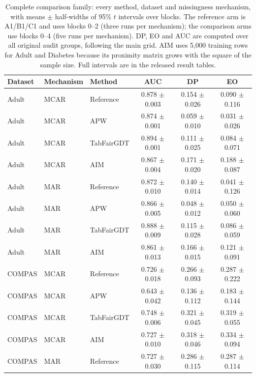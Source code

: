 \begin{table}[tb]
\centering\scriptsize
\setlength{\tabcolsep}{3pt}
\caption{Complete comparison family: every method, dataset and missingness mechanism, with means $\pm$ half-widths of 95\% $t$ intervals over blocks. The reference arm is A1/B1/C1 and uses blocks 0--2 (three runs per mechanism); the comparison arms use blocks 0--4 (five runs per mechanism). DP, EO and AUC are computed over all original audit groups, following the main grid. AIM uses 5{,}000 training rows for Adult and Diabetes because its proximity matrix grows with the square of the sample size. Full intervals are in the released result tables.}\label{tab:comparison-full}
\begin{tabular}{@{}lllccc@{}}
\toprule
Dataset & Mechanism & Method & AUC & DP & EO\\
\midrule
Adult     & MCAR & Reference            & 0.878 $\pm$ 0.003 & 0.154 $\pm$ 0.026 & 0.090 $\pm$ 0.116 \\
Adult     & MCAR & APW                  & 0.874 $\pm$ 0.001 & 0.059 $\pm$ 0.010 & 0.031 $\pm$ 0.026 \\
Adult     & MCAR & TabFairGDT           & 0.894 $\pm$ 0.001 & 0.111 $\pm$ 0.025 & 0.084 $\pm$ 0.071 \\
Adult     & MCAR & AIM                  & 0.867 $\pm$ 0.004 & 0.171 $\pm$ 0.020 & 0.188 $\pm$ 0.087 \\
Adult     & MAR  & Reference            & 0.872 $\pm$ 0.010 & 0.140 $\pm$ 0.014 & 0.041 $\pm$ 0.126 \\
Adult     & MAR  & APW                  & 0.866 $\pm$ 0.005 & 0.048 $\pm$ 0.012 & 0.050 $\pm$ 0.060 \\
Adult     & MAR  & TabFairGDT           & 0.888 $\pm$ 0.009 & 0.115 $\pm$ 0.028 & 0.086 $\pm$ 0.059 \\
Adult     & MAR  & AIM                  & 0.861 $\pm$ 0.013 & 0.166 $\pm$ 0.015 & 0.121 $\pm$ 0.091 \\
\midrule
COMPAS    & MCAR & Reference            & 0.726 $\pm$ 0.018 & 0.266 $\pm$ 0.093 & 0.287 $\pm$ 0.222 \\
COMPAS    & MCAR & APW                  & 0.643 $\pm$ 0.042 & 0.136 $\pm$ 0.112 & 0.183 $\pm$ 0.144 \\
COMPAS    & MCAR & TabFairGDT           & 0.748 $\pm$ 0.006 & 0.321 $\pm$ 0.045 & 0.319 $\pm$ 0.055 \\
COMPAS    & MCAR & AIM                  & 0.727 $\pm$ 0.010 & 0.318 $\pm$ 0.046 & 0.334 $\pm$ 0.094 \\
COMPAS    & MAR  & Reference            & 0.727 $\pm$ 0.030 & 0.286 $\pm$ 0.115 & 0.287 $\pm$ 0.114 \\

\end{tabular}
\end{table}
